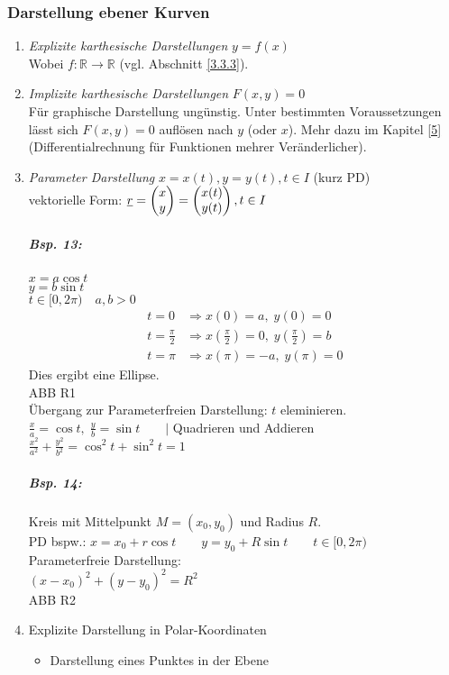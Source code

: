 \subsubsection{Darstellung ebener Kurven}
\begin{enumerate}
\item \emph{Explizite karthesische Darstellungen} $y=f(x)$\\
Wobei $f: \mathbb{R}\to \mathbb{R}$ (vgl. Abschnitt \ref{3.3.3}).
\item \emph{Implizite karthesische Darstellungen} $F(x,y)=0$\\
Für graphische Darstellung ungünstig. Unter bestimmten Voraussetzungen lässt sich $F(x,y)=0$ auflösen nach $y$ (oder $x$). Mehr dazu im Kapitel \ref{5} (Differentialrechnung für Funktionen mehrer Veränderlicher).
\item \emph{Parameter Darstellung} $x=x(t), y=y(t), t\in I$ (kurz PD)\\
vektorielle Form: $\underline{r}=\begin{pmatrix}x\\y\end{pmatrix}=\begin{pmatrix}x(t)\\y(t)\end{pmatrix}, t \in I$
\subparagraph{Bsp. 13:}\parskp
$x=a \cos t$\\
$y=b \sin t$\\
$t\in [0,2\pi) \quad a,b>0$
\begin{align*}
t=0 &\Rightarrow x(0)=a, \; y(0)=0\\
t=\frac{\pi}{2} &\Rightarrow x\left(\frac{\pi}{2}\right)=0, \; y\left(\frac{\pi}{2}\right)=b\\
t=\pi &\Rightarrow x\left(\pi\right)=-a,\; y(\pi)=0
\end{align*}
Dies ergibt eine Ellipse.\\
ABB R1\\
Übergang zur Parameterfreien Darstellung: $t$ eleminieren.\\
$\frac{x}{a}=\cos t, \; \frac{y}{b}=\sin t \qquad|$ Quadrieren und Addieren\\
$\boxed{\frac{x^2}{a^2}+\frac{y^2}{b^2}=\cos^2t+\sin^2t=1}$
\subparagraph{Bsp. 14:} Kreis mit Mittelpunkt $M=(x_0, y_0) $ und Radius $R$.\\
PD bspw.: $x=x_0+r\cos t \qquad y=y_0+R \sin t \qquad t \in [0,2\pi)$\\
Parameterfreie Darstellung: \\
$(x-x_0)^2+(y-y_0)^2=R^2$\\
ABB R2
\item Explizite Darstellung in Polar-Koordinaten
\begin{itemize}
\item Darstellung eines Punktes in der Ebene\\

\end{itemize}
\end{enumerate}
